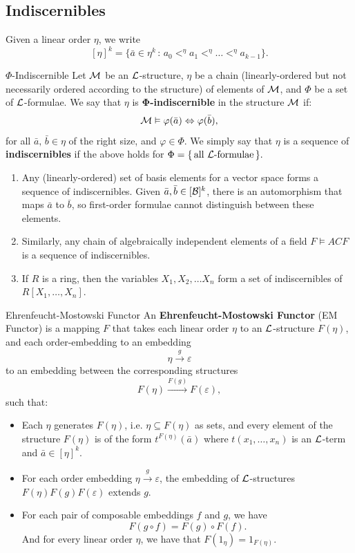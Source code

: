 \documentclass{article}
\numberwithin{thm}{subsection}
\begin{document}
\subsection{Indiscernibles}
Given a linear order $\eta$, we write \[ [\eta]^{k} = \{ \bar a \in \eta^{k} \, : \, a_{0} <^{\eta} a_{1} <^{\eta} \dots <^{\eta} a_{k-1} \}. \]
\begin{fancydefine}{$\Phi$-Indiscernible}
    Let $\mathcal{M}$ be an $\mathcal{L}$-structure, $\eta$ be a chain (linearly-ordered but not necessarily ordered according to the structure) of elements of $\mathcal{M}$, and $\Phi$ be a set of $\mathcal{L}$-formulae. We say that $\eta$ is $\mathbf{\Phi}$\textbf{-indiscernible} in the structure $\mathcal{M}$ if:\[
        \mathcal{M} \vDash \varphi(\bar a) \Leftrightarrow \varphi(\bar b), \]
    for all $\bar a, \, \bar b \in \eta $ of the right size, and $\varphi \in \Phi$. \gap 
    We simply say that $\eta$ is a sequence of \textbf{indiscernibles} if the above holds for $\Phi = \{ \, \text{all $\mathcal{L}$-formulae} \, \}.$
\end{fancydefine}
\begin{ex}\hspace{0.1cm}
    \begin{enumerate}
    \item Any (linearly-ordered) set of basis elements for a vector space forms a sequence of indiscernibles. Given $\bar a, \bar b \in [ \mathcal{B} ]^{k}$, there is an automorphism that maps $\bar a$ to $\bar b$, so first-order formulae cannot distinguish between these elements. 
    \item Similarly, any chain of algebraically independent elements of a field $F \models ACF$ is a sequence of indiscernibles.
    \item If $R$ is a ring, then the variables $X_{1},X_{2}, \dots X_{n}$ form a set of indiscernibles of $R[X_{1}, \dots, X_{n}]$.
    \end{enumerate}
\end{ex}
\begin{fancydefine}{Ehrenfeucht-Mostowski Functor}
    An \textbf{Ehrenfeucht-Mostowski Functor} (EM Functor) is a mapping $F$ that takes each linear order $\eta$ to an $\mathcal{L}$-structure $F(\eta)$, and each order-embedding to an embedding \[ \eta \xrightarrow{g} \varepsilon \] to an embedding between the corresponding structures \[ F(\eta) \xrightarrow{F(g)} F(\varepsilon), \]
    such that: \begin{itemize}
        \item Each $\eta$ generates $F(\eta)$, i.e. $\eta \subseteq F(\eta)$ as sets, and every element of the structure $F(\eta)$ is of the form $t^{F(\eta)}(\bar a)$ where $t(x_{1}, \dots, x_{n})$ is an $\mathcal{L}$-term and $\bar a \in [\eta]^{k}$.
        \item For each order embedding $\eta \xrightarrow{g} \varepsilon$, the embedding of $\mathcal{L}$-structures $F(\eta) F(g) F(\varepsilon)$ extends $g$.
        \item For each pair of composable embeddings $f$ and $g$, we have \[ F(g \circ f) = F(g) \circ F(f).\] And for every linear order $\eta$, we have that $F(1_{\eta}) = 1_{F(\eta)}$.
    \end{itemize}
\end{fancydefine}
\end{document}

